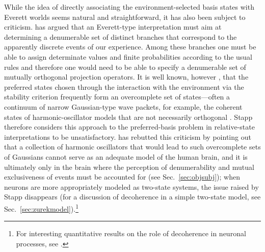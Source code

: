 \documentclass[twocolumn,rmp,aps,amsmath,amsfonts,noshowkeys,noshowpacs]{revtex4}
\begin{document}
While the idea of directly associating the environment-selected basis
states with Everett worlds seems natural and straightforward, it has
also been subject to criticism. \citet{Stapp:2002:pc} has argued that
an Everett-type interpretation must aim at determining a denumerable
set of distinct branches that correspond to the apparently discrete
events of our experience. Among these branches one must be able to
assign determinate values and finite probabilities according to the
usual rules and therefore one would need to be able to specify a
denumerable set of mutually orthogonal projection operators.  It is
well known, however \citep{Zurek:1998:re}, that the preferred states
chosen through the interaction with the environment via the stability
criterion frequently form an overcomplete set of states---often a
continuum of narrow Gaussian-type wave packets, for example, the
coherent states of harmonic-oscillator models that are not necessarily
orthogonal \citetext{i.e., the Gaussians may overlap; see
  \citealp{Kubler:1973:ux,Zurek:1993:qq}}.  Stapp therefore considers
this approach to the preferred-basis problem in relative-state
interpretations to be unsatisfactory. \citet{Zurek:2003:uu} has
rebutted this criticism by pointing out that a collection of harmonic
oscillators that would lead to such overcomplete sets of Gaussians
cannot serve as an adequate model of the human brain, and it is
ultimately only in the brain where the perception of denumerability
and mutual exclusiveness of events must be accounted for (see
Sec.~\ref{sec:objsubj}); when neurons are more appropriately modeled
as two-state systems, the issue raised by Stapp disappears (for a
discussion of decoherence in a simple two-state model, see
Sec.~\ref{sec:zurekmodel}).\footnote{For interesting quantitative
  results on the role of decoherence in neuronal processes, see
  \citet{Tegmark:2000:wz}.}
\end{document}
